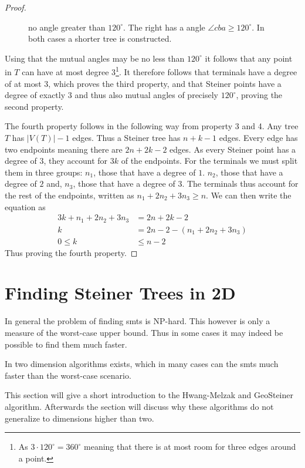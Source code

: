 \begin{proof}
{\begin{figure}[htbp]
{  no angle greater than $120^{\circ}$. The right has a angle
  $\angle cba \ge 120^{\circ}$. In both cases a shorter tree is
  constructed\footnotemark.\label{fig:preliminaries-steiner-point}}
\end{figure}
}
%
Using that the mutual angles may be no less than $120^{\circ}$ it follows that
any point in $T$ can have at most degree $3$\footnote{As
  $3 \cdot 120^{\circ} = 360^{\circ}$ meaning that there is at most room for
  three edges around a point.}. It therefore follows that terminals have a
degree of at most $3$, which proves the third property, and that Steiner points
have a degree of exactly $3$ and thus also mutual angles of precisely
$120^{\circ}$, proving the second property.

The fourth property follows in the following way from property 3 and 4. Any tree
$T$ has $|V(T)|-1$ edges. Thus a Steiner tree has $n+k-1$ edges.  Every edge has
two endpoints meaning there are $2 n + 2 k - 2$ edges. As every Steiner point
has a degree of $3$, they account for $3 k$ of the endpoints. For the terminals
we must split them in three groups: $n_1$, those that have a degree of
$1$. $n_2$, those that have a degree of $2$ and, $n_3$, those that have a degree
of $3$. The terminals thus account for the rest of the endpoints, written as
$n_1 + 2 n_2 + 3 n_3 \ge n$. We can then write the equation as
%
\begin{align}
  \label{eq:22}
  3 k + n_1 + 2 n_2 + 3 n_3 &= 2 n + 2 k - 2 \\
  k &= 2 n - 2 - (n_1 + 2 n_2 + 3 n_3) \\
  0 \le k &\le n - 2
\end{align}
%
Thus proving the fourth property.
\end{proof}

\section{Finding Steiner Trees in 2D}
\label{sec:find-stein-trees-2}

In general the problem of finding \acp{smt} is NP-hard. This however is only a
measure of the worst-case upper bound. Thus in some cases it may indeed be
possible to find them much faster.

In two dimension algorithms exists, which in many cases can the \acp{smt} much
faster than the worst-case scenario.

This section will give a short introduction to the Hwang-Melzak and GeoSteiner
algorithm. Afterwards the section will discuss why these algorithms do not
generalize to dimensions higher than two.

